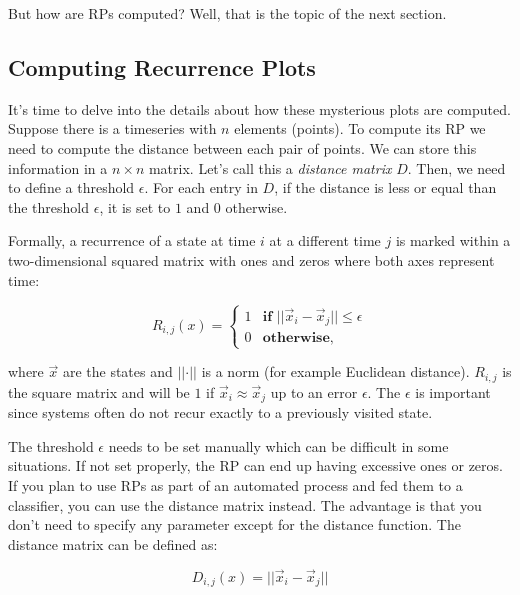 \documentclass[
  11pt,
]{krantz}
\begin{document}
But how are RPs computed? Well, that is the topic of the next section.

\hypertarget{computing-recurrence-plots}{%
\subsection{Computing Recurrence Plots}\label{computing-recurrence-plots}}

It's time to delve into the details about how these mysterious plots are computed. Suppose there is a timeseries with \(n\) elements (points). To compute its RP we need to compute the distance between each pair of points. We can store this information in a \(n \times n\) matrix. Let's call this a \emph{distance matrix} \(D\). Then, we need to define a threshold \(\epsilon\). For each entry in \(D\), if the distance is less or equal than the threshold \(\epsilon\), it is set to \(1\) and \(0\) otherwise.

Formally, a recurrence of a state at time \(i\) at a different time \(j\) is marked within a two-dimensional squared matrix with ones and zeros where both axes represent time:

\begin{equation}
  R_{i,j} \left( x \right) =
 \begin{cases}
  1 & \textbf{if } \lvert\lvert \vec{x}_i - \vec{x}_j \rvert \rvert \leq \epsilon \\
  0 & \textbf{otherwise},
 \end{cases}
  \label{eq:rp}
\end{equation}

where \(\vec{x}\) are the states and \(\lvert\lvert \cdot \rvert \rvert\) is a norm (for example Euclidean distance). \(R_{i,j}\) is the square matrix and will be \(1\) if \(\vec{x}_i \approx \vec{x}_j\) up to an error \(\epsilon\). The \(\epsilon\) is important since systems often do not recur exactly to a previously visited state.

The threshold \(\epsilon\) needs to be set manually which can be difficult in some situations. If not set properly, the RP can end up having excessive ones or zeros. If you plan to use RPs as part of an automated process and fed them to a classifier, you can use the distance matrix instead. The advantage is that you don't need to specify any parameter except for the distance function. The distance matrix can be defined as:

\begin{equation} \label{eq:distance_matrix}
 D_{i,j} \left( x \right) = \lvert\lvert \vec{x}_i - \vec{x}_j \rvert \rvert
\end{equation}
\end{document}
